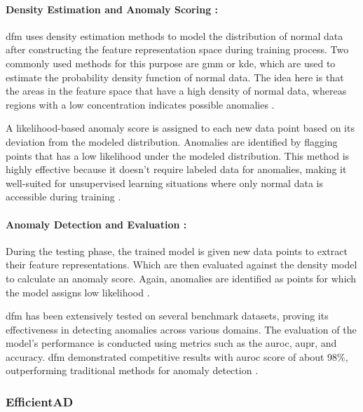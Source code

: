 \paragraph*{Density Estimation and Anomaly Scoring :}

\gls{dfm} uses density estimation methods to model the distribution of normal data after constructing the feature representation space during training process. Two commonly used methods for this purpose are \gls{gmm} or \gls{kde}, which are used to estimate the probability density function of normal data. The idea here is that the areas in the feature space that have a high density of normal data, whereas regions with a low concentration indicates possible anomalies \cite{ahuja2019probabilisticmodelingdeepfeatures}.

A likelihood-based anomaly score is assigned to each new data point based on its deviation from the modeled distribution. Anomalies are identified by flagging points that has a low likelihood under the modeled distribution. This method is highly effective because it doesn't require labeled data for anomalies, making it well-suited for unsupervised learning situations where only normal data is accessible during training \cite{ahuja2019probabilisticmodelingdeepfeatures}.

\paragraph*{Anomaly Detection and Evaluation :}

During the testing phase, the trained model is given new data points to extract their feature representations. Which are then evaluated against the density model to calculate an anomaly score. Again, anomalies are identified as points for which the model assigns low likelihood \cite{ahuja2019probabilisticmodelingdeepfeatures}.

\gls{dfm} has been extensively tested on several benchmark datasets, proving its effectiveness in detecting anomalies across various domains. The evaluation of the model's performance is conducted using metrics such as the \gls{auroc}, \gls{aupr}, and accuracy. \gls{dfm} demonstrated competitive results with \gls{auroc} score of about 98\%, outperforming traditional methods for anomaly detection \cite{ahuja2019probabilisticmodelingdeepfeatures}. 

\subsubsection{EfficientAD}
\label{subsec:efficientad}

